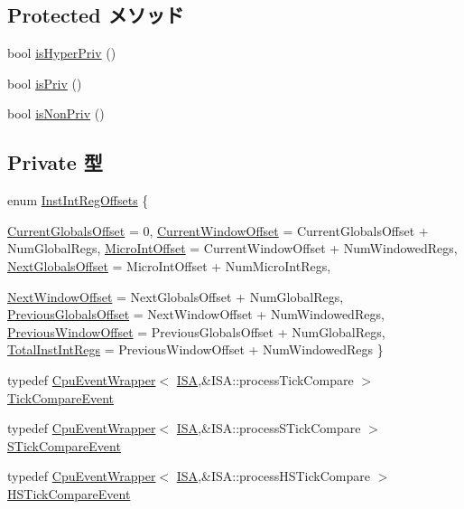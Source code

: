 \subsection*{Protected メソッド}
\begin{DoxyCompactItemize}
\item 
bool \hyperlink{classSparcISA_1_1ISA_a842f98879c435ed5980772bd9a48ec85}{isHyperPriv} ()
\item 
bool \hyperlink{classSparcISA_1_1ISA_a9ce1572daa5a507ad7a319d5de9e6fe3}{isPriv} ()
\item 
bool \hyperlink{classSparcISA_1_1ISA_a3e258d603a97a9f1693046a8f2b227b3}{isNonPriv} ()
\end{DoxyCompactItemize}
\subsection*{Private 型}
\begin{DoxyCompactItemize}
\item 
enum \hyperlink{classSparcISA_1_1ISA_acdbae92f22e3cb157c78d08e5a56f132}{InstIntRegOffsets} \{ \par
\hyperlink{classSparcISA_1_1ISA_acdbae92f22e3cb157c78d08e5a56f132a8ddf639e9d7f7721aa26a5d1b8001c94}{CurrentGlobalsOffset} =  0, 
\hyperlink{classSparcISA_1_1ISA_acdbae92f22e3cb157c78d08e5a56f132a10baad906f67874d234e79a6ea2cd5c2}{CurrentWindowOffset} =  CurrentGlobalsOffset + NumGlobalRegs, 
\hyperlink{classSparcISA_1_1ISA_acdbae92f22e3cb157c78d08e5a56f132a18465f66d55c0d4e47b1725075e781f7}{MicroIntOffset} =  CurrentWindowOffset + NumWindowedRegs, 
\hyperlink{classSparcISA_1_1ISA_acdbae92f22e3cb157c78d08e5a56f132a2f3b64c7dd09a753db6ed45de075a722}{NextGlobalsOffset} =  MicroIntOffset + NumMicroIntRegs, 
\par
\hyperlink{classSparcISA_1_1ISA_acdbae92f22e3cb157c78d08e5a56f132aa2887eefe1d14f5e91bc7a4cb6ee1019}{NextWindowOffset} =  NextGlobalsOffset + NumGlobalRegs, 
\hyperlink{classSparcISA_1_1ISA_acdbae92f22e3cb157c78d08e5a56f132a23d0b05b9e659a09779ea2285309b79c}{PreviousGlobalsOffset} =  NextWindowOffset + NumWindowedRegs, 
\hyperlink{classSparcISA_1_1ISA_acdbae92f22e3cb157c78d08e5a56f132abbced67d7e86c489436870ebbf669941}{PreviousWindowOffset} =  PreviousGlobalsOffset + NumGlobalRegs, 
\hyperlink{classSparcISA_1_1ISA_acdbae92f22e3cb157c78d08e5a56f132adecfaa9607681de2f0741d2c17a6b512}{TotalInstIntRegs} =  PreviousWindowOffset + NumWindowedRegs
 \}
\item 
typedef \hyperlink{classCpuEventWrapper}{CpuEventWrapper}$<$ \hyperlink{classSparcISA_1_1ISA}{ISA},\&ISA::processTickCompare $>$ \hyperlink{classSparcISA_1_1ISA_aa0cdda97db933627d221397f0073c608}{TickCompareEvent}
\item 
typedef \hyperlink{classCpuEventWrapper}{CpuEventWrapper}$<$ \hyperlink{classSparcISA_1_1ISA}{ISA},\&ISA::processSTickCompare $>$ \hyperlink{classSparcISA_1_1ISA_a8a23f1de4077b437f4cb46bb42bea046}{STickCompareEvent}
\item 
typedef \hyperlink{classCpuEventWrapper}{CpuEventWrapper}$<$ \hyperlink{classSparcISA_1_1ISA}{ISA},\&ISA::processHSTickCompare $>$ \hyperlink{classSparcISA_1_1ISA_ac90fb4d74917543141ff203e233b2635}{HSTickCompareEvent}
\end{DoxyCompactItemize}
